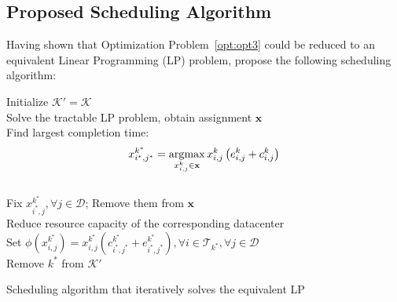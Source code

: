 \subsection{Proposed Scheduling Algorithm}

Having shown that Optimization Problem~\ref{opt:opt3} could be reduced to an equivalent Linear Programming (LP) problem, \citet{Chen2017} propose the following scheduling algorithm:

\begin{algorithm}[H]
  \label{alg:main}

  Initialize \(\mathcal{K}' = \mathcal{K}\) \\
   {
    Solve the tractable LP problem, obtain assignment \(\mathbf{x}\) \\
    Find largest completion time: \[x_{i^*, j^*}^{k^*} = \operatorname*{\arg\!\max}\limits_{x_{i, j}^k \in\mathbf{x}} x_{i, j}^k\left(e^k_{i, j} + c^k_{i, j}\right)\] \\
    Fix \(x_{i^*, j}^{k^*},\forall j\in\mathcal{D}\); Remove them from \(\mathbf{x}\) \\
    Reduce resource capacity of the corresponding datacenter \\
    Set \(\phi\left(x^{k^*}_{i, j}\right) = x^{k^*}_{i, j}\left(c^{k^*}_{i^*, j^*} + e^{k^*}_{i^*, j^*}\right),\forall i\in \mathcal{T}_{k^*}, \forall j\in \mathcal{D}\) \\
    Remove \(k^*\) from \(\mathcal{K}'\)
  }
  \caption{Scheduling algorithm that iteratively solves the equivalent LP}
\end{algorithm}

